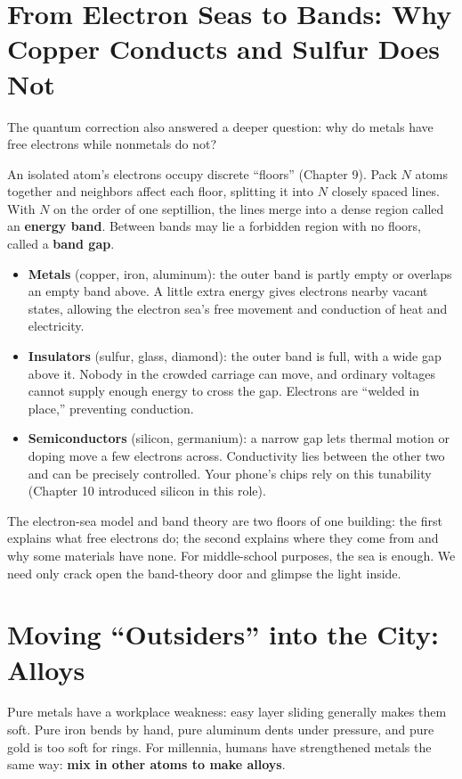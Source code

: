 \section{From Electron Seas to Bands: Why Copper Conducts and Sulfur Does Not}

The quantum correction also answered a deeper question: why do metals have free electrons while nonmetals do not?

An isolated atom's electrons occupy discrete ``floors'' (Chapter 9). Pack $N$ atoms together and neighbors affect each floor, splitting it into $N$ closely spaced lines. With $N$ on the order of one septillion, the lines merge into a dense region called an \textbf{energy band}. Between bands may lie a forbidden region with no floors, called a \textbf{band gap}.

\begin{itemize}[itemsep=2pt]
\item \textbf{Metals} (copper, iron, aluminum): the outer band is partly empty or overlaps an empty band above. A little extra energy gives electrons nearby vacant states, allowing the electron sea's free movement and conduction of heat and electricity.
\item \textbf{Insulators} (sulfur, glass, diamond): the outer band is full, with a wide gap above it. Nobody in the crowded carriage can move, and ordinary voltages cannot supply enough energy to cross the gap. Electrons are ``welded in place,'' preventing conduction.
\item \textbf{Semiconductors} (silicon, germanium): a narrow gap lets thermal motion or doping move a few electrons across. Conductivity lies between the other two and can be precisely controlled. Your phone's chips rely on this tunability (Chapter 10 introduced silicon in this role).
\end{itemize}

The electron-sea model and band theory are two floors of one building: the first explains what free electrons do; the second explains where they come from and why some materials have none. For middle-school purposes, the sea is enough. We need only crack open the band-theory door and glimpse the light inside.

\section{Moving ``Outsiders'' into the City: Alloys}

Pure metals have a workplace weakness: easy layer sliding generally makes them soft. Pure iron bends by hand, pure aluminum dents under pressure, and pure gold is too soft for rings. For millennia, humans have strengthened metals the same way: \textbf{mix in other atoms to make alloys}.

